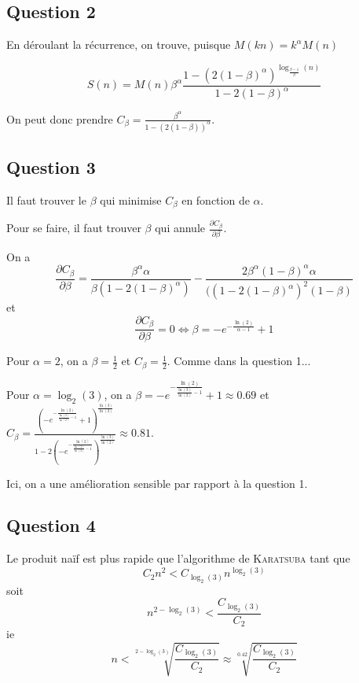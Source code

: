 \subsection*{Question 2}

En déroulant la récurrence, on trouve, puisque $M(kn) = k^\alpha M(n)$

\[
    S(n) = M(n) \beta^\alpha \frac{1-(2(1-\beta)^\alpha)^{\log_{\frac{\beta - 1}{\beta}} (n)}}{1-2(1-\beta)^\alpha}
\]

On peut donc prendre $C_\beta = \frac{\beta^\alpha}{1-(2(1-\beta))^\alpha}$.

\subsection*{Question 3}

Il faut trouver le $\beta$ qui minimise $C_\beta$ en fonction de $\alpha$.

Pour se faire, il faut trouver $\beta$ qui annule $\frac{\partial C_\beta}{\partial \beta}$.

On a 
\[
    \frac{\partial C_\beta}{\partial \beta} =  \frac{\beta^\alpha \alpha}{\beta(1-2(1-\beta)^\alpha)}-\frac{2\beta^\alpha(1-\beta)^\alpha \alpha}{((1-2(1-\beta)^\alpha)^2(1-\beta)}
\]
et
\[
    \frac{\partial C_\beta}{\partial \beta} = 0 \Leftrightarrow \beta = -e^{-\frac{\ln(2)}{\alpha-1}} +1
\]

\bigskip

Pour $\alpha =2$, on a $\beta = \frac{1}{2}$ et $C_\beta = \frac{1}{2}$. Comme dans la question 1...

Pour $\alpha = \log_2(3)$, on a $\beta = -e^{-\frac{\ln(2)}{\frac{\ln(3)}{\ln(2)}-1}}+1\approx 0.69$ et $C_\beta = \frac{\left ( -e^{-\frac{\ln(2)}{\frac{\ln(3)}{\ln(2)}-1}}+1\right)^{\frac{\ln(3)}{\ln(2)}}}{1-2\left ( -e^{-\frac{\ln(2)}{\frac{\ln(3)}{\ln(2)}-1}}\right)^{\frac{\ln(3)}{\ln(2)}}}\approx 0.81$.

Ici, on a une amélioration sensible par rapport à la question 1.

\subsection*{Question 4}

Le produit naïf est plus rapide que l'algorithme de \textsc{Karatsuba} tant que
\[
    C_2 n^2 < C_{\log_2(3)} n^{\log_2(3)}
\]
soit 
\[
    n^{2-\log_2(3)} < \frac{C_{\log_2(3)}}{C_2}
\]
ie
\[
    n < \sqrt[2-\log_2(3)]{\frac{C_{\log_2(3)}}{C_2}} \approx \sqrt[0.42]{\frac{C_{\log_2(3)}}{C_2}}
\]


